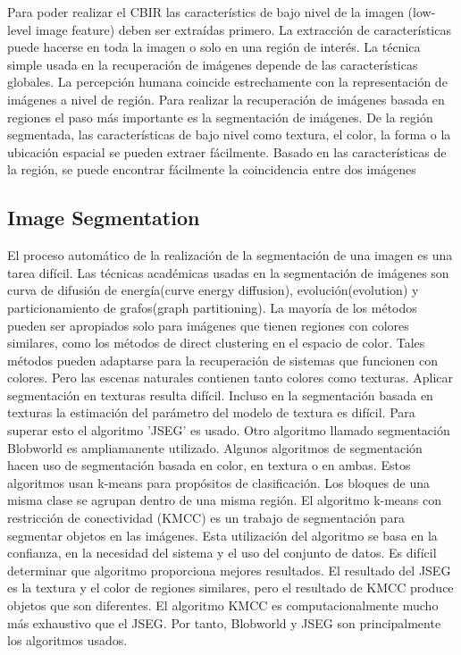 \documentclass{llncs}
\begin{document}
Para poder realizar el CBIR las caracter\'istics de bajo nivel de la imagen  (low-level image feature) deben ser extra\'idas 
primero. La extracci\'on de caracter\'isticas puede hacerse en toda la imagen o solo en una regi\'on de inter\'es. La t\'ecnica
simple usada en la recuperaci\'on de im\'agenes depende de las caracter\'isticas globales. La percepci\'on humana coincide 
estrechamente con la representaci\'on de im\'agenes a nivel de regi\'on. Para realizar la recuperaci\'on de im\'agenes 
basada en regiones el paso m\'as importante es la segmentaci\'on de im\'agenes. De la regi\'on segmentada, las caracter\'isticas 
de bajo nivel como textura, el color, la forma o la ubicaci\'on espacial se pueden extraer f\'acilmente. Basado en las caracter\'isticas
de la regi\'on, se puede encontrar f\'acilmente la coincidencia entre dos im\'agenes 

\subsection{ Image Segmentation}
El proceso autom\'atico de la realizaci\'on de la segmentaci\'on de una imagen es una tarea dif\'icil. Las t\'ecnicas acad\'emicas 
usadas en la segmentaci\'on de im\'agenes son curva de difusi\'on de energ\'ia(curve energy diffusion), evoluci\'on(evolution) y particionamiento 
de grafos(graph partitioning). La mayor\'ia de los m\'etodos pueden ser apropiados solo para im\'agenes que tienen regiones con colores
similares, como los m\'etodos de direct clustering en el espacio de color. Tales m\'etodos pueden adaptarse para la recuperaci\'on de sistemas 
que funcionen con colores. Pero las escenas naturales contienen tanto colores como texturas. Aplicar segmentaci\'on en texturas resulta 
dif\'icil. Incluso en la segmentaci\'on basada en texturas la estimaci\'on del par\'ametro del modelo de textura es dif\'icil. Para 
superar esto el algoritmo 'JSEG' es usado. Otro algoritmo llamado segmentaci\'on Blobworld es ampliamanente utilizado. Algunos algoritmos 
de segmentaci\'on hacen uso de segmentaci\'on basada en color, en textura o en ambas. Estos algoritmos usan k-means para prop\'ositos de 
clasificaci\'on. Los bloques de una misma clase se agrupan dentro de una misma regi\'on. El algoritmo k-means con restricci\'on de 
conectividad (KMCC) es un trabajo de segmentaci\'on para segmentar objetos en las im\'agenes. Esta utilizaci\'on del algoritmo  se basa 
en la confianza, en la necesidad del sistema y el uso del conjunto de datos. Es dif\'icil determinar que algoritmo proporciona mejores 
resultados. El resultado del JSEG es la textura y el color de regiones similares, pero el resultado de KMCC produce objetos que son diferentes.
El algoritmo KMCC es computacionalmente mucho m\'as exhaustivo que el JSEG. Por tanto, Blobworld y JSEG son principalmente los algoritmos usados.
\end{document}
